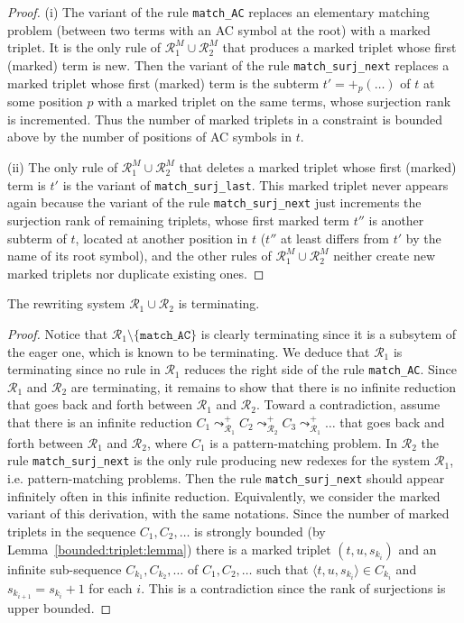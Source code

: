\documentclass[submission,copyright,creativecommons]{eptcs}
\newcommand \set[1]{\{#1\}}
\newcommand \trip[1]{\langle #1 \rangle}
\numberwithin{subcase}{case}
\begin{document}
\begin{proof}
(i) The variant of the rule \texttt{match\_AC} replaces an elementary matching
problem (between two terms with an AC symbol at the root) with a marked triplet.
It is the only rule of $\mathcal{R}_1^{M} \cup \mathcal{R}_2^{M}$ that produces a
marked triplet whose first (marked) term is new. Then the variant of the rule
\texttt{match\_surj\_next} replaces a marked triplet whose first (marked) term is
the subterm $t' = +_p(\ldots)$ of $t$ at some position $p$ with a marked
triplet on the same terms, whose surjection rank is incremented. Thus
the number of marked triplets in a constraint is bounded above by the number of
positions of AC symbols in $t$.

(ii) The only rule of $\mathcal{R}_1^{M} \cup \mathcal{R}_2^{M}$ that deletes a
marked triplet whose first (marked) term is $t'$ is the variant of
\texttt{match\_surj\_last}. This marked triplet never appears again because the
variant of the rule \texttt{match\_surj\_next} just increments the surjection
rank of remaining triplets, whose first marked term $t''$ is another subterm of
$t$, located at another position in $t$ ($t''$ at least differs from $t'$ by the
name of its root symbol), and the other rules of $\mathcal{R}_1^{M} \cup
\mathcal{R}_2^{M}$ neither create new marked triplets nor duplicate existing
ones.
\end{proof}

\begin{lemma}\label{R12:termination:lemma}
The rewriting system ${\mathcal{R}_1} \cup \mathcal{R}_2$ is terminating.
\end{lemma}

\begin{proof}
Notice that $\mathcal{R}_1 \setminus \set{\texttt{match\_AC}} $ is clearly
terminating since it is a subsytem of the eager one, which is known
to be terminating.  We deduce that ${\mathcal{R}}_1$ is terminating since no
rule in ${\mathcal{R}}_1$ reduces the right side of the rule 
\texttt{match\_AC}.
Since $\mathcal{R}_1$ and $\mathcal{R}_2$ are terminating, it remains to show
that there is no infinite  reduction that goes back and forth between
$\mathcal{R}_1$ and $\mathcal{R}_2$. Toward a contradiction, assume that there is
an infinite reduction $C_1 \leadsto^+_{\mathcal{R}_1} C_2
\leadsto^+_{\mathcal{R}_2} C_3 \leadsto^+_{\mathcal{R}_1}\ldots$ that goes back
and forth between ${\mathcal{R}_1}$ and ${\mathcal{R}_2}$, where $C_1$
 is a pattern-matching problem. In $\mathcal{R}_2$ the rule \texttt{match\_surj\_next}
is the only rule producing new redexes for the system $\mathcal{R}_1$, i.e.
pattern-matching problems. Then the rule \texttt{match\_surj\_next} should
appear infinitely often in this infinite reduction. Equivalently, we consider
the marked variant of this derivation, with the same notations. Since the
number of marked triplets in the sequence $C_1,C_2,\ldots$ is strongly bounded (by
Lemma~\ref{bounded:triplet:lemma}) there is a marked triplet $(t,u,s_{k_i})$ and
an infinite sub-sequence $C_{k_1},C_{k_2},\ldots$ of $C_1,C_2,\ldots$ such that
$\trip{t,u,s_{k_i}} \in C_{k_i}$ and $s_{k_{i+1}}=s_{k_{i}}+1$ for each $i$.
This is a contradiction since the rank of surjections is upper bounded.
\end{proof}
\end{document}
